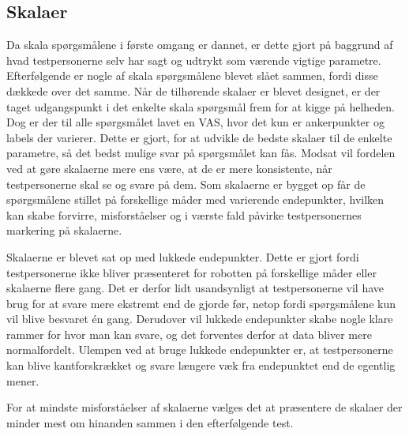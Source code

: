 \subsection{Skalaer}
\label{DiskussionSkalaer}
Da skala spørgsmålene i første omgang er dannet, er dette gjort på baggrund af hvad testpersonerne selv har sagt og udtrykt som værende vigtige parametre. Efterfølgende er nogle af skala spørgsmålene blevet slået sammen, fordi disse dækkede over det samme. Når de tilhørende skalaer er blevet designet, er der taget udgangspunkt i det enkelte skala spørgsmål frem for at kigge på helheden. Dog er der til alle spørgsmålet lavet en VAS, hvor det kun er ankerpunkter og labels der varierer. Dette er gjort, for at udvikle de bedste skalaer til de enkelte parametre, så det bedst mulige svar på spørgsmålet kan fås. Modsat vil fordelen ved at gøre skalaerne mere ens være, at de er mere konsistente, når testpersonerne skal se og svare på dem. Som skalaerne er bygget op får de spørgsmålene stillet på forskellige måder med varierende endepunkter, hvilken kan skabe forvirre, misforståelser og i værste fald påvirke testpersonernes markering på skalaerne. 

Skalaerne er blevet sat op med lukkede endepunkter. Dette er gjort fordi testpersonerne ikke bliver præsenteret for robotten på forskellige måder eller skalaerne flere gang. Det er derfor lidt usandsynligt at testpersonerne vil have brug for at svare mere ekstremt end de gjorde før, netop fordi spørgsmålene kun vil blive besvaret én gang. Derudover vil lukkede endepunkter skabe nogle klare rammer for hvor man kan svare, og det forventes derfor at data bliver mere normalfordelt. Ulempen ved at bruge lukkede endepunkter er, at testpersonerne kan blive kantforskrækket og svare længere væk fra endepunktet end de egentlig mener. 

For at mindste misforståelser af skalaerne vælges det at præsentere de skalaer der minder mest om hinanden sammen i den efterfølgende test.